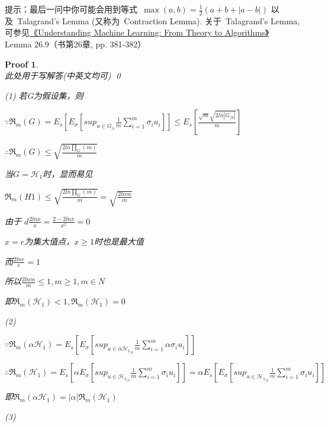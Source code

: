 \documentclass[a4paper,UTF8]{article}
\numberwithin{equation}{section}
\newtheorem*{myProof}{Proof}
\begin{document}
\noindent 提示：最后一问中你可能会用到等式~$\max(a, b) =\frac{1}{2}(a+b+|a-b|)$ 以及~Talagrand's Lemma (又称为~Contraction Lemma). 关于~Talagrand's Lemma, 可参见\href{http://www.cs.huji.ac.il/~shais/UnderstandingMachineLearning/copy.html}{《Understanding Machine Learning: From Theory to Algorithms》} ~ Lemma 26.9（书第26章, pp. 381-382）

\begin{myProof}~\\
    此处用于写解答(中英文均可)
    \qed
     
    
    (1)
    若G为假设集，则
    
    $\because \mathfrak{R}_m\left ( G \right ) = E_s\left [ E_\sigma \left [ sup_{u\in G_{|s}}\frac{1}{m}\sum_{i=1}^{m}\sigma _iu_i\right ] \right ]\leq E_s\left [ \frac{\sqrt{m}\sqrt{2ln|G_{|S}|}}{m} \right ]$
    
    $\therefore \mathfrak{R}_m\left ( G \right )\leq \sqrt{\frac{2ln\prod_{G}^{}\left ( m \right )}{m}}$
    
    当$G=\mathcal{H}_1$时，显而易见
    
    $\mathfrak{R}_m\left ( H1 \right )\leq\sqrt{\frac{2ln\prod_{G}^{}\left ( m \right )}{m}} = \sqrt{\frac{2ln m}{m}} $
    
    由于
    $d\frac{2ln x}{x} = \frac{2-2lnx}{x^{2}} = 0$
    
    $x=e$为集大值点，$x \geq 1$时也是最大值
    
    而$\frac{2lne}{e} = 1$
    
    所以$\frac{2lnm}{m} \leq 1 , m\geq1, m \in N$
    
    即$\mathfrak{R}_m\left ( \mathcal{H}_1 \right ) < 1, \mathfrak{R}_m\left (\mathcal{H}_1  \right )=0$
    
    
    (2)
    
    $\because \mathfrak{R}_m\left ( \mathcal{\alpha H}_1 \right ) = E_s\left [ E_\sigma \left [ sup_{u\in {\mathcal{\alpha H}_1}_{|s}}\frac{1}{m}\sum_{i=1}^{m}\alpha \sigma _iu_i\right ] \right ]$
    
    $\therefore  \mathfrak{R}_m\left ( \mathcal{ H}_1 \right )=E_s\left [\alpha  E_\sigma \left [ sup_{u\in {\mathcal{ H}_1}_{|s}}\frac{1}{m}\sum_{i=1}^{m} \sigma _iu_i\right ] \right ]=\alpha E_s\left [  E_\sigma \left [ sup_{u\in {\mathcal{ H}_1}_{|s}}\frac{1}{m}\sum_{i=1}^{m} \sigma _iu_i\right ] \right ]$
    
    即$\mathfrak{R}_m(\alpha \mathcal{H}_1) = |\alpha|\mathfrak{R}_m(\mathcal{H}_1)$
    
    (3)
    

\end{myProof}
\end{document}

